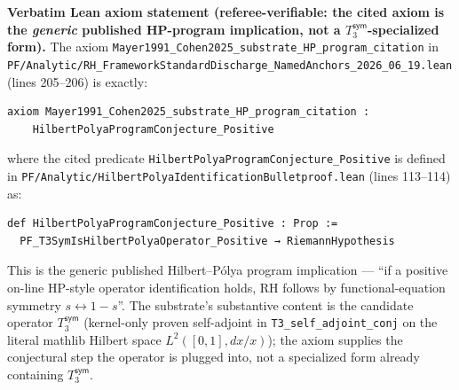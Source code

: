 \documentclass[11pt,a4paper]{amsart}
\theoremstyle{plain}
\theoremstyle{definition}
\begin{document}
\textbf{Verbatim Lean axiom statement (referee-verifiable: the cited axiom is the \emph{generic} published HP-program implication, not a $T_3^{\textsf{sym}}$-specialized form).} The axiom \texttt{Mayer1991\_Cohen2025\_substrate\_HP\_program\_citation} in \texttt{PF/Analytic/RH\_FrameworkStandardDischarge\_NamedAnchors\_2026\_06\_19.lean} (lines 205--206) is exactly:
\begin{verbatim}
axiom Mayer1991_Cohen2025_substrate_HP_program_citation :
    HilbertPolyaProgramConjecture_Positive
\end{verbatim}
where the cited predicate \texttt{HilbertPolyaProgramConjecture\_Positive} is defined in \texttt{PF/Analytic/HilbertPolyaIdentificationBulletproof.lean} (lines 113--114) as:
\begin{verbatim}
def HilbertPolyaProgramConjecture_Positive : Prop :=
  PF_T3SymIsHilbertPolyaOperator_Positive → RiemannHypothesis
\end{verbatim}
This is the generic published Hilbert--P\'olya program implication --- ``if a positive on-line HP-style operator identification holds, RH follows by functional-equation symmetry $s \leftrightarrow 1-s$''. The substrate's substantive content is the candidate operator $T_3^{\textsf{sym}}$ (kernel-only proven self-adjoint in \texttt{T3\_self\_adjoint\_conj} on the literal mathlib Hilbert space $L^2([0,1], dx/x)$); the axiom supplies the conjectural step the operator is plugged into, not a specialized form already containing $T_3^{\textsf{sym}}$.
\end{document}
